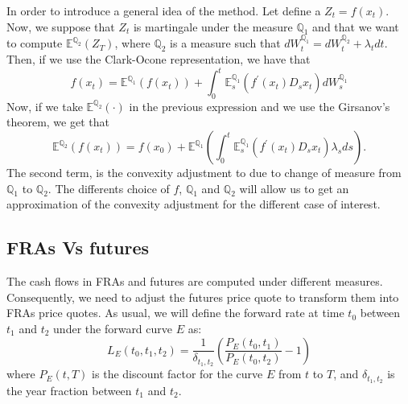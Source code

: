 \documentclass[a4paper,10pt]{article}
\newcommand{\1}{\mathbf{1}}
\begin{document}
In order to introduce a general idea of the method. Let define a $Z_t = f(x_t)$. Now, we suppose that $Z_t$ is martingale under the measure $\mathbb{Q}_1$ and that we want to compute $\mathbb{E}^{\mathbb{Q}_2}\left(Z_T \right)$, where $\mathbb{Q}_2$ is a measure such that $dW^{\mathbb{Q}_1}_t = dW^{\mathbb{Q}_2}_t +\lambda_t dt$. Then, if we use the Clark-Ocone representation, we have that
\begin{equation*}
f(x_t) = \mathbb{E}^{\mathbb{Q}_1}\left(f(x_t)\right) + \int_{0}^{t} \mathbb{E}^{\mathbb{Q}_1}_s\left( f^{\prime}(x_t) D_s x_t  \right) dW^{\mathbb{Q}_1}_s
\end{equation*}
Now, if we take $\mathbb{E}^{\mathbb{Q}_2}\left( \cdot \right)$ in the previous expression and we use the Girsanov's theorem, we get that
\begin{equation}\label{general_convexity}
\mathbb{E}^{\mathbb{Q}_2}\left( f(x_t) \right) = f(x_0) + \mathbb{E}^{\mathbb{Q}_1} \left(\int_{0}^{t}  \mathbb{E}^{\mathbb{Q}_1}_s\left( f^{\prime}(x_t) D_s x_t  \right) \lambda_s ds \right). 
\end{equation}
The second term, is the convexity adjustment to due to change of measure from $\mathbb{Q}_1$ to $\mathbb{Q}_2$. The differents choice of $f$, $\mathbb{Q}_1$ and $\mathbb{Q}_2$ will allow us to get an approximation of the convexity adjustment for the different case of interest. 
\subsection{FRAs Vs futures}
 The cash flows in FRAs and futures are computed under different measures. Consequently, we need to adjust the futures price quote to transform them into FRAs price quotes. As usual, we will define the forward rate at time $t_0$ between $t_1$ and $t_2$ under the forward curve $E$ as:
\begin{equation}\label{forward_rate}
L_{E}(t_0, t_1, t_2) = \frac{1}{\delta_{t_1,t_2}}\left(\frac{P_{E}(t_0,t_1)}{P_{E}(t_0,t_2)} - 1 \right)
\end{equation} 
where $P_{E}(t,T)$ is the discount factor for the curve $E$ from $t$ to $T$, and $\delta_{t_1,t_2}$ is the year fraction between $t_1$ and $t_2$. 
\end{document}
